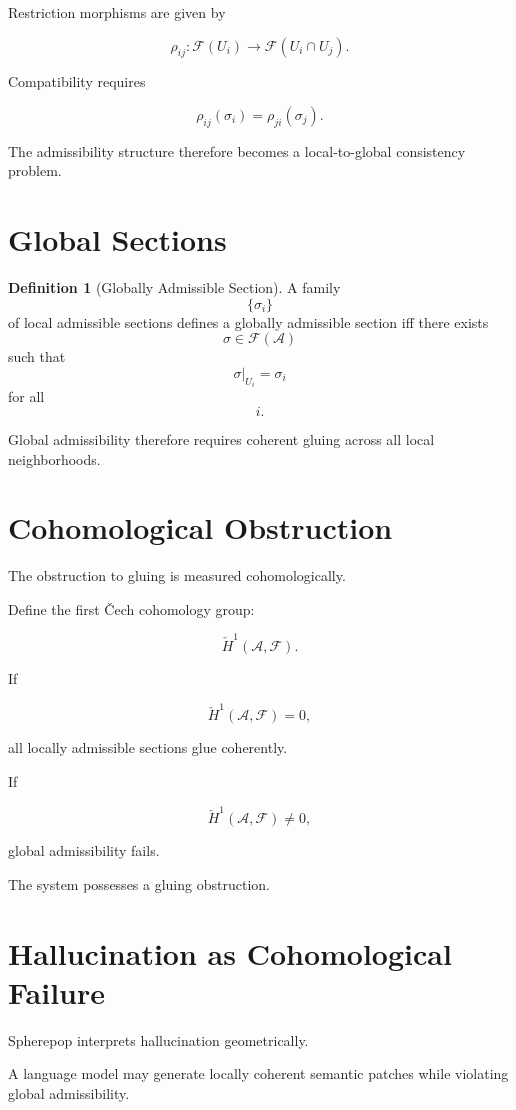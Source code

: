 \documentclass[12pt,openany]{book}
\theoremstyle{plain}
\theoremstyle{definition}
\newtheorem{definition}[theorem]{Definition}
\theoremstyle{remark}
\begin{document}
Restriction morphisms are given by

\[
\rho_{ij} :
\mathcal{F}(U_i)
\to
\mathcal{F}(U_i\cap U_j).
\]

Compatibility requires

\[
\rho_{ij}(\sigma_i)
=
\rho_{ji}(\sigma_j).
\]

The admissibility structure therefore becomes a local-to-global
consistency problem.

\section{Global Sections}

\begin{definition}[Globally Admissible Section]
A family
\[
\{\sigma_i\}
\]
of local admissible sections defines a globally admissible
section iff there exists
\[
\sigma\in\mathcal{F}(\mathcal{A})
\]
such that
\[
\sigma|_{U_i}
=
\sigma_i
\]
for all
\[
i.
\]
\end{definition}

Global admissibility therefore requires coherent gluing across
all local neighborhoods.

\section{Cohomological Obstruction}

The obstruction to gluing is measured cohomologically.

Define the first \v{C}ech cohomology group:

\[
\check{H}^1(\mathcal{A},\mathcal{F}).
\]

If

\[
\check{H}^1(\mathcal{A},\mathcal{F})
=
0,
\]

all locally admissible sections glue coherently.

If

\[
\check{H}^1(\mathcal{A},\mathcal{F})
\neq
0,
\]

global admissibility fails.

The system possesses a gluing obstruction.

\section{Hallucination as Cohomological Failure}

Spherepop interprets hallucination geometrically.

A language model may generate locally coherent semantic patches
while violating global admissibility.
\end{document}
